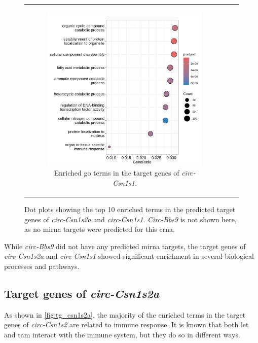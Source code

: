 \begin{figure}[H]
\begin{tabular}{ccc}
\begin{subfigure}{0.5\textwidth}
            \includegraphics[width=\linewidth]{chapters/4_results_and_discussion/figures/dea/deseq2/letrozole/chr5:87817372-87821139_targets.txt.png}
            \caption{Enriched \gls{go} terms in the target
                genes of \textit{circ-Csn1s1}.
            }
            \label{fig:tg_csn1s1}
        \end{subfigure}
    \end{tabular}
    \caption{Dot plots showing the top 10 enriched terms in the predicted
        target genes of
        \textit{circ-Csn1s2a} and \textit{circ-Csn1s1}.
        \textit{Circ-Bbs9} is not shown here, as no \gls{mirna} targets were
        predicted for this \gls{crna}.
    }
    \label{fig:target_genes}
\end{figure}

While \textit{circ-Bbs9} did not have any predicted \gls{mirna} targets, the
target genes of \textit{circ-Csn1s2a} and \textit{circ-Csn1s1} showed
significant enrichment in several biological processes and pathways.

\subsection{Target genes of \textit{circ-Csn1s2a}}

As shown in \cref{fig:tg_csn1s2a}, the majority of the enriched terms in the
target genes of \textit{circ-Csn1s2} are related to immune response.
It is known that both \gls{let} and \gls{tam} interact with the immune system,
but they do so in different ways.

